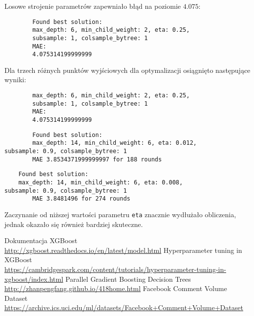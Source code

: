 \documentclass[a4paper,12p]{article}
\begin{document}
	Losowe strojenie parametrów zapewniało błąd na poziomie $4.075$:
	
	\begin{verbatim}
		Found best solution:
		max_depth: 6, min_child_weight: 2, eta: 0.25,
		subsample: 1, colsample_bytree: 1
		MAE:	
		4.075314199999999
	\end{verbatim}
	
	Dla trzech różnych punktów wyjściowych dla optymalizacji osiągnięto następujące wyniki:
	
	\begin{verbatim}
		max_depth: 6, min_child_weight: 2, eta: 0.25,
		subsample: 1, colsample_bytree: 1
		MAE:	
		4.075314199999999
	\end{verbatim}
	
	\begin{verbatim}
		Found best solution:
		max_depth: 14, min_child_weight: 6, eta: 0.012,
subsample: 0.9, colsample_bytree: 1
        MAE 3.8534371999999997 for 188 rounds
	\end{verbatim}
	
	\begin{verbatim}
	Found best solution:
	max_depth: 14, min_child_weight: 6, eta: 0.008,
subsample: 0.9, colsample_bytree: 1
        MAE 3.8481496 for 274 rounds
	\end{verbatim}
	
	Zaczynanie od niższej wartości parametru \texttt{eta} znacznie wydłużało obliczenia, jednak okazało się również bardziej skuteczne.
	
	

\begin{thebibliography}{1}
 Dokumentacja XGBoost \\ \url{http://xgboost.readthedocs.io/en/latest/model.html}
 Hyperparameter tuning in XGBoost \\ \url{https://cambridgespark.com/content/tutorials/hyperparameter-tuning-in-xgboost/index.html}
 Parallel Gradient Boosting Decision Trees \\ \url{http://zhanpengfang.github.io/418home.html}
 Facebook Comment Volume Dataset \\ \url{https://archive.ics.uci.edu/ml/datasets/Facebook+Comment+Volume+Dataset}
\end{thebibliography}	
	
\end{document}
